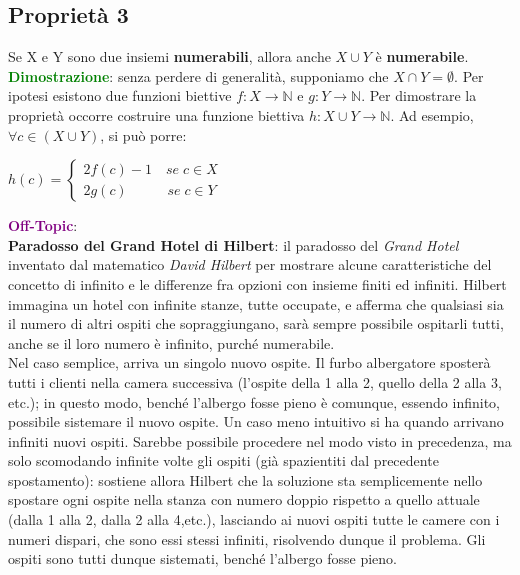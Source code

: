 \subsection{Proprietà 3}
Se X e Y sono due insiemi \textbf{numerabili}, allora anche $X \cup Y$ è \textbf{numerabile}. \\
\textcolor{green}{\textbf{Dimostrazione}}: senza perdere di generalità, supponiamo che $X \cap Y = \emptyset$. Per ipotesi esistono due funzioni biettive $f : X \rightarrow \mathbb{N}$ e $g : Y \rightarrow \mathbb{N}$. Per dimostrare la proprietà occorre costruire una funzione biettiva $h : X \cup Y \rightarrow \mathbb{N}$. Ad esempio, $\forall c \in (X \cup Y)$, si può porre:
\begin{center}
    \begin{math}
        h(c) = 
        \begin{cases}
            2f(c) - 1 \quad se \; c \in X \\
            2g(c) \;\;\; \qquad se \; c \in Y
        \end{cases}
    \end{math}
\end{center}

\begin{boxA}
    \textcolor{purple}{\textbf{Off-Topic}}: \\
    \textbf{Paradosso del Grand Hotel di Hilbert}: il paradosso del \textit{Grand Hotel} inventato dal matematico \textit{David Hilbert} per mostrare alcune caratteristiche del concetto di infinito e le differenze fra opzioni con insieme finiti ed infiniti. Hilbert immagina un hotel con infinite stanze, tutte occupate, e afferma che qualsiasi sia il numero di altri ospiti che sopraggiungano, sarà sempre possibile ospitarli tutti, anche se il loro numero è infinito, purché numerabile. \\
    Nel caso semplice, arriva un singolo nuovo ospite. Il furbo albergatore sposterà tutti i clienti nella camera successiva (l'ospite della 1 alla 2, quello della 2 alla 3, etc.); in questo modo, benché l'albergo fosse pieno è comunque, essendo infinito, possibile sistemare il nuovo ospite.
    Un caso meno intuitivo si ha quando arrivano infiniti nuovi ospiti. Sarebbe possibile procedere nel modo visto in precedenza, ma solo scomodando infinite volte gli ospiti (già spazientiti dal precedente spostamento): sostiene allora Hilbert che la soluzione sta semplicemente nello spostare ogni ospite nella stanza con numero doppio rispetto a quello attuale (dalla 1 alla 2, dalla 2 alla 4,etc.), lasciando ai nuovi ospiti tutte le camere con i numeri dispari, che sono essi stessi infiniti, risolvendo dunque il problema. Gli ospiti sono tutti dunque sistemati, benché l'albergo fosse pieno.
\end{boxA}


